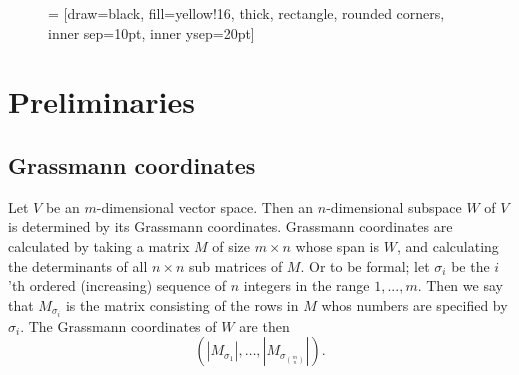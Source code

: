 \documentclass[a4paper,12pt]{book}
\theoremstyle{plain}
\theoremstyle{definition}
\begin{document}
\begin{figure}
	 = [draw=black, fill=yellow!16, thick,
	rectangle, rounded corners, inner sep=10pt, inner ysep=20pt]
\end{figure}

\chapter{Preliminaries}
\section{Grassmann coordinates} %
\label{sec:grassmann_coordinates}

Let \( V \) be an \( m \)-dimensional vector space. Then an \( n
\)-dimensional subspace \( W \) of \( V \) is determined by its
Grassmann coordinates. Grassmann coordinates are calculated by taking
a matrix \( M \) of size \( m \times n \) whose span is \( W \), and
calculating the determinants of all \( n \times n \) sub matrices of
\( M \). Or to be formal; let \( \sigma_i \) be the \( i \)'th ordered
(increasing) sequence of \( n \) integers in the range \( 1,...,m \).
Then we say that \( M_{\sigma_i} \) is the matrix consisting of the
rows in \( M \) whos numbers are specified by \( \sigma_i \). The
Grassmann coordinates of \( W \) are then
\[
     \left( |M_{\sigma_1}|, \ldots, |M_{\sigma_{m \choose n}}| \right).
\]
\end{document}
